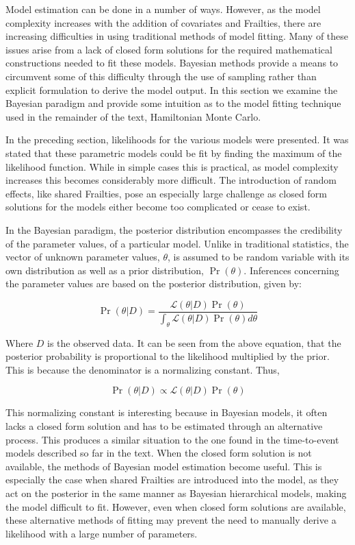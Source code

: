 Model estimation can be done in a number of ways. However, as the model complexity increases with the addition of covariates and Frailties, there are increasing difficulties in using traditional methods of model fitting. Many of these issues arise from a lack of closed form solutions for the required mathematical constructions needed to fit these models. Bayesian methods provide a means to circumvent some of this difficulty through the use of sampling rather than explicit formulation to derive the model output. In this section we examine the Bayesian paradigm and provide some intuition as to the model fitting technique used in the remainder of the text, Hamiltonian Monte Carlo.

In the preceding section, likelihoods for the various models were presented. It was stated that these parametric models could be fit by finding the maximum of the likelihood function. While in simple cases this is practical, as model complexity increases this becomes considerably more difficult. The introduction of random effects, like shared Frailties, pose an especially large challenge as closed form solutions for the models either become too complicated or cease to exist.

In the Bayesian paradigm, the posterior distribution encompasses the credibility of the parameter values, of a particular model. Unlike in traditional statistics, the vector of unknown parameter values, $\theta$, is assumed to be random variable with its own distribution as well as a prior distribution, $\Pr(\theta)$\cite{Ibrahim2005}. Inferences concerning the parameter values are based on the posterior distribution, given by:

$$ \Pr(\theta|D) = \frac{\mathcal {L}(\theta|D)\Pr(\theta)}{\int_\theta\mathcal {L}(\theta|D)\Pr(\theta) d\theta} $$

Where $D$ is the observed data. It can be seen from the above equation, that the posterior probability is proportional to the likelihood multiplied by the prior. This is because the denominator is a normalizing constant. Thus,

$$ \Pr(\theta|D) \propto  \mathcal {L}(\theta|D)\Pr(\theta) $$

This normalizing constant is interesting because in Bayesian models, it often lacks a closed form solution and has to be estimated through an alternative process. This produces a similar situation to the one found in the time-to-event models described so far in the text. When the closed form solution is not available, the methods of Bayesian model estimation become useful. This is especially the case when shared Frailties are introduced into the model, as they act on the posterior in the same manner as Bayesian hierarchical models, making the model difficult to fit. However, even when closed form solutions are available, these alternative methods of fitting may prevent the need to manually derive a likelihood with a large number of parameters.

